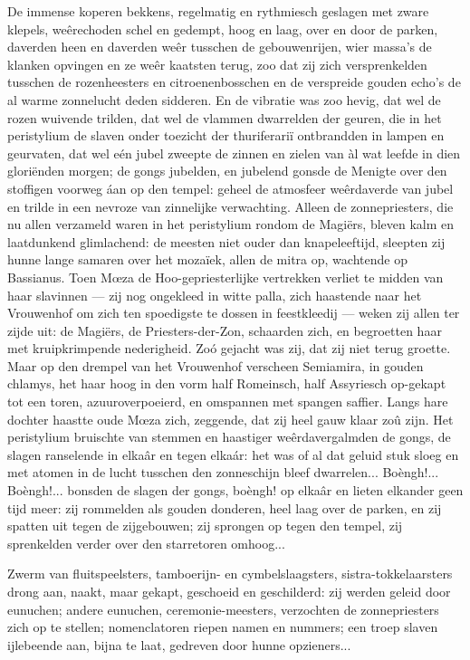 \documentclass[a4paper, 12pt, oneside, dutch]{article}
\begin{document}
De immense koperen bekkens, regelmatig en rythmiesch geslagen met zware klepels, weêrechoden schel en gedempt, hoog en laag, over en door de parken, daverden heen en daverden weêr tusschen de gebouwenrijen, wier massa's de klanken opvingen en ze weêr kaatsten terug, zoo dat zij zich versprenkelden tusschen de rozenheesters en citroenenbosschen en de verspreide gouden echo's de al warme zonnelucht deden sidderen. En de vibratie was zoo hevig, dat wel de rozen wuivende trilden, dat wel de vlammen dwarrelden der geuren, die in het peristylium de slaven onder toezicht der thuriferariï ontbrandden in lampen en geurvaten, dat wel eén jubel zweepte de zinnen en zielen van àl wat leefde in dien gloriënden morgen; de gongs jubelden, en jubelend gonsde de Menigte over den stoffigen voorweg áan op den tempel: geheel de atmosfeer weêrdaverde van jubel en trilde in een nevroze van zinnelijke verwachting. Alleen de zonnepriesters, die nu allen verzameld waren in het peristylium rondom de Magiërs, bleven kalm en laatdunkend glimlachend: de meesten niet ouder dan knapeleeftijd, sleepten zij hunne lange samaren over het mozaïek, allen de mitra op, wachtende op Bassianus. Toen Mœza de Hoo-gepriesterlijke vertrekken verliet te midden van haar slavinnen --- zij nog ongekleed in witte palla, zich haastende naar het Vrouwenhof om zich ten spoedigste te dossen in feestkleedij --- weken zij allen ter zijde uit: de Magiërs, de Priesters-der-Zon, schaarden zich, en begroetten haar met kruipkrimpende nederigheid. Zoó gejacht was zij, dat zij niet terug groette. Maar op den drempel van het Vrouwenhof verscheen Semiamira, in gouden chlamys, het haar hoog in den vorm half Romeinsch, half Assyriesch op-gekapt tot een toren, azuuroverpoeierd, en omspannen met spangen saffier. Langs hare dochter haastte oude Mœza zich, zeggende, dat zij heel gauw klaar zoû zijn. Het peristylium bruischte van stemmen en haastiger weêrdavergalmden de gongs, de slagen ranselende in elkaâr en tegen elkaár: het was of al dat geluid stuk sloeg en met atomen in de lucht tusschen den zonneschijn bleef dwarrelen... Boèngh!... Boèngh!... bonsden de slagen der gongs, boèngh! op elkaâr en lieten elkander geen tijd meer: zij rommelden als gouden donderen, heel laag over de parken, en zij spatten uit tegen de zijgebouwen; zij sprongen op tegen den tempel, zij sprenkelden verder over den starretoren omhoog...

Zwerm van fluitspeelsters, tamboerijn- en cymbelslaagsters, sistra-tokkelaarsters drong aan, naakt, maar gekapt, geschoeid en geschilderd: zij werden geleid door eunuchen; andere eunuchen, ceremonie-meesters, verzochten de zonnepriesters zich op te stellen; nomenclatoren riepen namen en nummers; een troep slaven ijlebeende aan, bijna te laat, gedreven door hunne opzieners...
\end{document}
